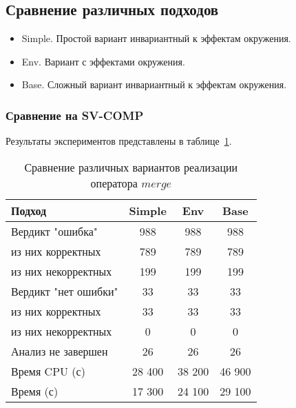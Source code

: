 \subsection{Сравнение различных подходов }

\begin{itemize}
\item Simple. Простой вариант инвариантный к эффектам окружения.
\item Env. Вариант с эффектами окружения.
\item Base. Сложный вариант инвариантный к эффектам окружения.
\end{itemize}

\subsubsection{Сравнение на SV-COMP}
Результаты экспериментов представлены в таблице~\ref{table-drivers-lock-merge}.

\begin{center}
  \begin{table}[h]\footnotesize
  	\label{table-drivers-lock-merge}
    \caption{Сравнение различных вариантов реализации оператора $merge$}
    \begin{tabular}{ | l | c | c | c | }
      \hline
      Подход         				& Simple   	& Env 		& Base  	\\ \hline
      Вердикт "ошибка" 				& 988    	& 988       & 988       \\ 
  \hspace{0.5cm} из них корректных 	& 789 		& 789 		& 789    	\\ 
  \hspace{0.5cm} из них некорректных & 199 		& 199 		& 199     	\\ \hline
      Вердикт "нет ошибки"  		& 33      	& 33        & 33       	\\ 
  \hspace{0.5cm} из них корректных 	& 33 		& 33    	& 33      	\\
  \hspace{0.5cm} из них некорректных & 0 		& 0    		& 0     	\\ \hline
      Анализ не завершен       		& 26     	& 26        & 26    	\\ \hline
      Время CPU (с)   				& 28 400 	& 38 200    & 46 900  	\\ 
      Время (с)  					& 17 300 	& 24 100    & 29 100    \\
      \hline
    \end{tabular}
  \end{table}
\end{center}

